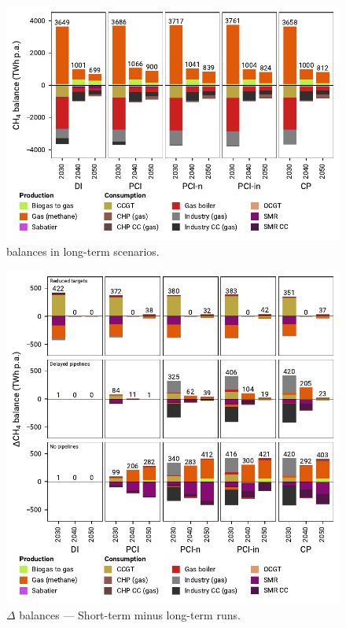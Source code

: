 \documentclass[final,5p,times,twocolumn,sort&compress]{elsarticle}
\begin{document}
\begin{figure}[htbp]
  \centering
  \includegraphics[width=\linewidth]{balances_overview_gas}
  \caption{ balances in long-term scenarios.}
  \label{fig:balances_overview_gas}
\end{figure}

\begin{figure}[htbp]
  \centering
  \includegraphics[width=\linewidth]{balances_overview_extended_gas}
  \caption{$\Delta$ balances --- Short-term minus long-term runs.}
  \label{fig:balances_overview_extended_gas}
\end{figure}
\end{document}
